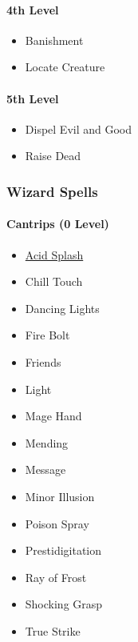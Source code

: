 \paragraph{4th Level}\label{_4th_level}

\begin{itemize}
\item
  Banishment
\item
  Locate Creature
\end{itemize}

\paragraph{5th Level}\label{_5th_level}

\begin{itemize}
\item
  Dispel Evil and Good
\item
  Raise Dead
\end{itemize}

\subsubsection{Wizard Spells}\label{_wizard_spells}

\paragraph{Cantrips (0 Level)}\label{_cantrips_0_level}

\begin{itemize}
\item
  \hyperref[spell-acid-splash]{Acid Splash}
\item
  Chill Touch
\item
  Dancing Lights
\item
  Fire Bolt
\item
  Friends
\item
  Light
\item
  Mage Hand
\item
  Mending
\item
  Message
\item
  Minor Illusion
\item
  Poison Spray
\item
  Prestidigitation
\item
  Ray of Frost
\item
  Shocking Grasp
\item
  True Strike
\end{itemize}


